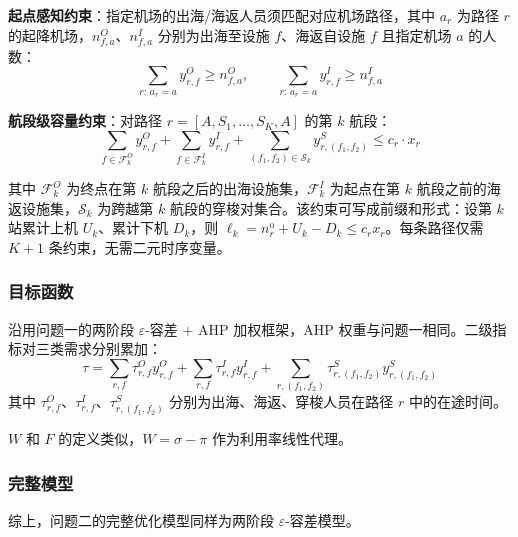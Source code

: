 \documentclass[withoutpreface]{cumcmthesis}
\begin{document}
\textbf{起点感知约束}：指定机场的出海/海返人员须匹配对应机场路径，其中 $a_r$ 为路径 $r$ 的起降机场，$n^{O}_{f,a}$、$n^{I}_{f,a}$ 分别为出海至设施 $f$、海返自设施 $f$ 且指定机场 $a$ 的人数：
\begin{equation}
\sum_{r:\, a_r = a} y^{O}_{r,f} \geq n^{O}_{f,a}, \qquad \sum_{r:\, a_r = a} y^{I}_{r,f} \geq n^{I}_{f,a}
\label{eq:q2_origin}
\end{equation}

\textbf{航段级容量约束}：对路径 $r = [A, S_1, \ldots, S_K, A]$ 的第 $k$ 航段：
\begin{equation}
\sum_{f \in \mathcal{F}^{O}_k} y^{O}_{r,f} + \sum_{f \in \mathcal{F}^{I}_k} y^{I}_{r,f} + \sum_{(f_1,f_2) \in \mathcal{S}_k} y^{S}_{r,(f_1,f_2)} \leq c_r \cdot x_r
\label{eq:q2_capacity}
\end{equation}

其中 $\mathcal{F}^{O}_k$ 为终点在第 $k$ 航段之后的出海设施集，$\mathcal{F}^{I}_k$ 为起点在第 $k$ 航段之前的海返设施集，$\mathcal{S}_k$ 为跨越第 $k$ 航段的穿梭对集合。该约束可写成前缀和形式：设第 $k$ 站累计上机 $U_k$、累计下机 $D_k$，则 $\ell_k = n_r^{\mathrm{o}} + U_k - D_k \leq c_r x_r$。每条路径仅需 $K+1$ 条约束，无需二元时序变量。

\subsubsection{目标函数}

沿用问题一的两阶段 $\varepsilon$-容差 + AHP 加权框架，AHP 权重与问题一相同。二级指标对三类需求分别累加：
\begin{equation}
\tau = \sum_{r,f} \tau^{O}_{r,f} y^{O}_{r,f} + \sum_{r,f} \tau^{I}_{r,f} y^{I}_{r,f} + \sum_{r,(f_1,f_2)} \tau^{S}_{r,(f_1,f_2)} y^{S}_{r,(f_1,f_2)}
\label{eq:q2_tau}
\end{equation}
其中 $\tau^{O}_{r,f}$、$\tau^{I}_{r,f}$、$\tau^{S}_{r,(f_1,f_2)}$ 分别为出海、海返、穿梭人员在路径 $r$ 中的在途时间。

$W$ 和 $F$ 的定义类似，$W = \sigma - \pi$ 作为利用率线性代理。

\subsubsection{完整模型}

综上，问题二的完整优化模型同样为两阶段 $\varepsilon$-容差模型。
\end{document}
